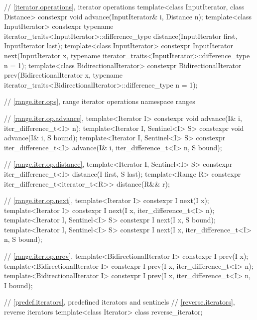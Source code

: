 \begin{codeblock}
{  // \ref{iterator.operations}, iterator operations
  template<class InputIterator, class Distance>
    constexpr void
      advance(InputIterator& i, Distance n);
  template<class InputIterator>
    constexpr typename iterator_traits<InputIterator>::difference_type
      distance(InputIterator first, InputIterator last);
  template<class InputIterator>
    constexpr InputIterator
      next(InputIterator x,
           typename iterator_traits<InputIterator>::difference_type n = 1);
  template<class BidirectionalIterator>
    constexpr BidirectionalIterator
      prev(BidirectionalIterator x,
           typename iterator_traits<BidirectionalIterator>::difference_type n = 1);

  // \ref{range.iter.ops}, range iterator operations
  namespace ranges {
    // \ref{range.iter.op.advance}, 
    template<Iterator I>
      constexpr void advance(I& i, iter_difference_t<I> n);
    template<Iterator I, Sentinel<I> S>
      constexpr void advance(I& i, S bound);
    template<Iterator I, Sentinel<I> S>
      constexpr iter_difference_t<I> advance(I& i, iter_difference_t<I> n, S bound);

    // \ref{range.iter.op.distance}, 
    template<Iterator I, Sentinel<I> S>
      constexpr iter_difference_t<I> distance(I first, S last);
    template<Range R>
      constexpr iter_difference_t<iterator_t<R>> distance(R&& r);

    // \ref{range.iter.op.next}, 
    template<Iterator I>
      constexpr I next(I x);
    template<Iterator I>
      constexpr I next(I x, iter_difference_t<I> n);
    template<Iterator I, Sentinel<I> S>
      constexpr I next(I x, S bound);
    template<Iterator I, Sentinel<I> S>
      constexpr I next(I x, iter_difference_t<I> n, S bound);

    // \ref{range.iter.op.prev}, 
    template<BidirectionalIterator I>
      constexpr I prev(I x);
    template<BidirectionalIterator I>
      constexpr I prev(I x, iter_difference_t<I> n);
    template<BidirectionalIterator I>
      constexpr I prev(I x, iter_difference_t<I> n, I bound);
  }

  // \ref{predef.iterators}, predefined iterators and sentinels
  // \ref{reverse.iterators}, reverse iterators
  template<class Iterator> class reverse_iterator;

}
\end{codeblock}
